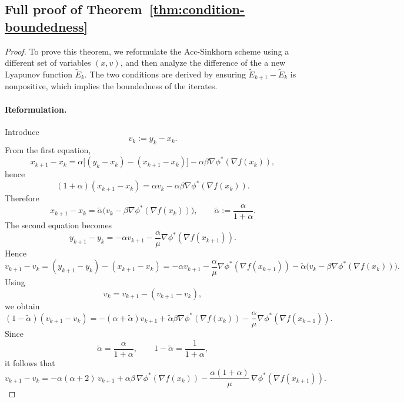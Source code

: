 \documentclass{article}
\theoremstyle{plain}
\theoremstyle{remark}
\begin{document}
\subsection{Full proof of Theorem~\ref{thm:condition-boundedness}}
\begin{proof}
To prove this theorem, we reformulate the Acc-Sinkhorn scheme using a different set of variables $(x,v)$, and then analyze the difference of the a new Lyapunov function $\tilde{E}_k$. The two conditions are derived by ensuring $\tilde{E}_{k+1}-\tilde{E}_k$ is nonpositive, which implies the boundedness of the iterates. 
\paragraph{Reformulation.} Introduce
\[
v_k := y_k - x_k.
\]
From the first equation,
\[
x_{k+1} - x_k = \alpha\bigl[(y_k - x_k) - (x_{k+1} - x_k)\bigr] - \alpha\beta\nabla \phi^*(\nabla f(x_k)),
\]
hence
\[
(1+\alpha)(x_{k+1}-x_k) = \alpha v_k - \alpha\beta\nabla \phi^*(\nabla f(x_k)).
\]
Therefore
\[
x_{k+1} - x_k = \tilde{\alpha}\bigl(v_k - \beta\nabla \phi^*(\nabla f(x_k))\bigr),
\qquad \tilde{\alpha} := \frac{\alpha}{1+\alpha}.
\]
The second equation becomes
\[
y_{k+1} - y_k = -\alpha v_{k+1} - \frac{\alpha}{\mu}\nabla \phi^*(\nabla f(x_{k+1})).
\]
Hence
\[
v_{k+1} - v_k = (y_{k+1}-y_k) - (x_{k+1}-x_k)
= -\alpha v_{k+1} - \frac{\alpha}{\mu}\nabla \phi^*(\nabla f(x_{k+1}))
- \tilde{\alpha}\bigl(v_k - \beta\nabla \phi^*(\nabla f(x_k))\bigr).
\]
Using
\[
v_k = v_{k+1} - (v_{k+1} - v_k),
\]
we obtain
\[
(1-\tilde{\alpha})(v_{k+1}-v_k)
= -(\alpha+\tilde{\alpha})v_{k+1}
+ \tilde{\alpha}\beta\nabla \phi^*(\nabla f(x_k))
- \frac{\alpha}{\mu}\nabla \phi^*(\nabla f(x_{k+1})).
\]
Since
\[
\tilde{\alpha} = \frac{\alpha}{1+\alpha}, \qquad 1 - \tilde{\alpha} = \frac{1}{1+\alpha},
\]
it follows that
\begin{equation}%
v_{k+1} - v_k
= -\alpha(\alpha+2)\,v_{k+1}
+ \alpha\beta\,\nabla \phi^*(\nabla f(x_k))
- \frac{\alpha(1+\alpha)}{\mu}\,\nabla \phi^*(\nabla f(x_{k+1})).
\end{equation}


\end{proof}
\end{document}
